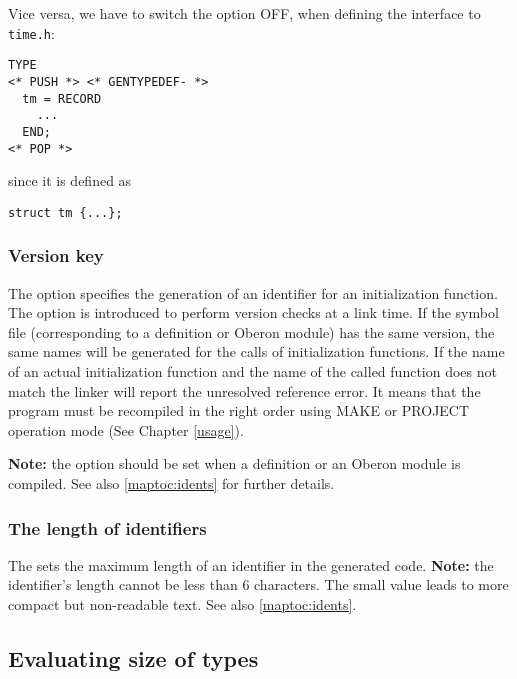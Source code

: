 Vice versa, we have to switch the option OFF,
when defining the interface to {\tt time.h}:
\begin{verbatim}
TYPE
<* PUSH *> <* GENTYPEDEF- *>
  tm = RECORD
    ...
  END;
<* POP *>
\end{verbatim}
since it is defined as
\begin{verbatim}
struct tm {...};
\end{verbatim}

\subsubsection{Version key}

The  option
specifies the generation of an identifier for an initialization function.
The option is introduced to perform version checks
at a link time. If the symbol file (corresponding to a definition
or Oberon module) has the same version, the same names will be
generated for the calls of initialization functions.
If the name of an actual initialization function and the name
of the called function does not match the linker will report
the unresolved reference error. It means that the program
must be recompiled in the right order using MAKE or
PROJECT operation mode (See Chapter \ref{usage}).

{\bf Note:} the option should be set when
a definition or an Oberon module is compiled. See also \ref{maptoc:idents}
for further details.

\subsubsection{The length of identifiers}

The   sets the
maximum  length  of an identifier in the generated code. {\bf Note:}
the identifier's length cannot be less than 6 characters. The small
value  leads  to  more  compact  but  non-readable text. See also
\ref{maptoc:idents}.

%


\subsection{Evaluating size of types}\label{maptoc:opt:sizeof}

